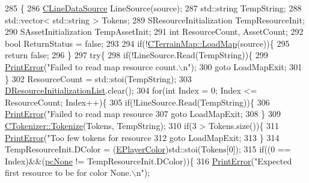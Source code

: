 \begin{DoxyCode}
285                                                                    \{
286     \hyperlink{classCLineDataSource}{CLineDataSource} LineSource(source);
287     std::string TempString;
288     std::vector< std::string > Tokens;
289     SResourceInitialization TempResourceInit;
290     SAssetInitialization TempAssetInit;
291     \textcolor{keywordtype}{int} ResourceCount, AssetCount;
292     \textcolor{keywordtype}{bool} ReturnStatus = \textcolor{keyword}{false};
293     
294     \textcolor{keywordflow}{if}(!\hyperlink{classCTerrainMap_a620258ecf38afb6275c865dad4fc4af4}{CTerrainMap::LoadMap}(source))\{
295         \textcolor{keywordflow}{return} \textcolor{keyword}{false};
296     \}
297     \textcolor{keywordflow}{try}\{
298         \textcolor{keywordflow}{if}(!LineSource.Read(TempString))\{
299             \hyperlink{Debug_8h_a2ed825eefefe35baf59a93a8c641323d}{PrintError}(\textcolor{stringliteral}{"Failed to read map resource count.\(\backslash\)n"});
300             \textcolor{keywordflow}{goto} LoadMapExit;
301         \}
302         ResourceCount = std::stoi(TempString);
303         \hyperlink{classCAssetDecoratedMap_ab4c78aeb90280ea98a3aa542cdb7f8cc}{DResourceInitializationList}.clear();
304         \textcolor{keywordflow}{for}(\textcolor{keywordtype}{int} Index = 0; Index <= ResourceCount; Index++)\{
305             \textcolor{keywordflow}{if}(!LineSource.Read(TempString))\{
306                 \hyperlink{Debug_8h_a2ed825eefefe35baf59a93a8c641323d}{PrintError}(\textcolor{stringliteral}{"Failed to read map resource %
307                 \textcolor{keywordflow}{goto} LoadMapExit;
308             \}
309             \hyperlink{classCTokenizer_a7477f6849a3d0a5154879d8622e4012c}{CTokenizer::Tokenize}(Tokens, TempString);
310             \textcolor{keywordflow}{if}(3 > Tokens.size())\{
311                 \hyperlink{Debug_8h_a2ed825eefefe35baf59a93a8c641323d}{PrintError}(\textcolor{stringliteral}{"Too few tokens for resource %
312                 \textcolor{keywordflow}{goto} LoadMapExit;
313             \}
314             TempResourceInit.DColor = (\hyperlink{GameDataTypes_8h_aafb0ca75933357ff28a6d7efbdd7602f}{EPlayerColor})std::stoi(Tokens[0]);
315             \textcolor{keywordflow}{if}((0 == Index)&&(\hyperlink{GameDataTypes_8h_aafb0ca75933357ff28a6d7efbdd7602fa88767aa8e02c7b3192bbab4127b3d729}{pcNone} != TempResourceInit.DColor))\{
316                 \hyperlink{Debug_8h_a2ed825eefefe35baf59a93a8c641323d}{PrintError}(\textcolor{stringliteral}{"Expected first resource to be for color None.\(\backslash\)n"});
}}
\end{DoxyCode}
